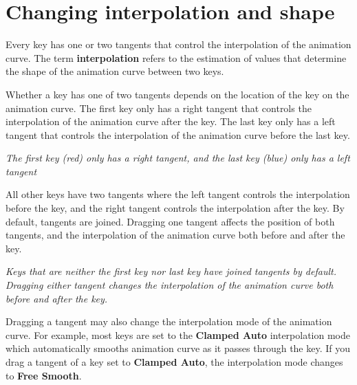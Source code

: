 \chapter{Changing interpolation and shape}
\hypertarget{md__library_2_package_cache_2com_8unity_8timeline_0d1_87_86_2_documentation_0i_2crv__keys__interp}{}\label{md__library_2_package_cache_2com_8unity_8timeline_0d1_87_86_2_documentation_0i_2crv__keys__interp}
\label{md__library_2_package_cache_2com_8unity_8timeline_0d1_87_86_2_documentation_0i_2crv__keys__interp_autotoc_md1139}%
%
 Every key has one or two tangents that control the interpolation of the animation curve. The term {\bfseries{interpolation}} refers to the estimation of values that determine the shape of the animation curve between two keys.

Whether a key has one of two tangents depends on the location of the key on the animation curve. The first key only has a right tangent that controls the interpolation of the animation curve after the key. The last key only has a left tangent that controls the interpolation of the animation curve before the last key.



{\itshape The first key (red) only has a right tangent, and the last key (blue) only has a left tangent}

All other keys have two tangents where the left tangent controls the interpolation before the key, and the right tangent controls the interpolation after the key. By default, tangents are joined. Dragging one tangent affects the position of both tangents, and the interpolation of the animation curve both before and after the key.



{\itshape Keys that are neither the first key nor last key have joined tangents by default. Dragging either tangent changes the interpolation of the animation curve both before and after the key.}

Dragging a tangent may also change the interpolation mode of the animation curve. For example, most keys are set to the {\bfseries{Clamped Auto}} interpolation mode which automatically smooths animation curve as it passes through the key. If you drag a tangent of a key set to {\bfseries{Clamped Auto}}, the interpolation mode changes to {\bfseries{Free Smooth}}.

